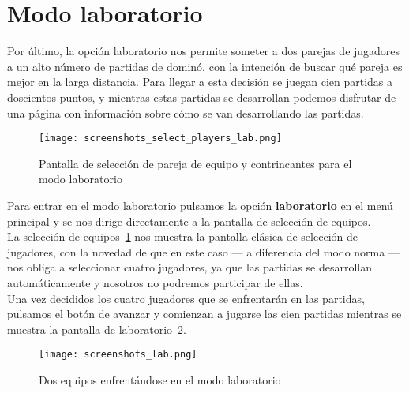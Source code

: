 \section{Modo laboratorio}

Por último, la opción laboratorio nos permite someter a dos parejas de jugadores a un alto número de partidas
de dominó, con la intención de buscar qué pareja es mejor en la larga distancia. Para llegar a esta decisión se
juegan cien partidas a doscientos puntos, y mientras estas partidas se desarrollan podemos disfrutar de una página
con información sobre cómo se van desarrollando las partidas. \\

\begin{figure}[h]
  \begin{center}
    \texttt{[image: screenshots\_select\_players\_lab.png]}
  \end{center}
  \caption{Pantalla de selección de pareja de equipo y contrincantes para el modo laboratorio}
  \label{fig:screenshotsselectplayerslab}
\end{figure}

Para entrar en el modo laboratorio pulsamos la opción \textbf{laboratorio} en el menú principal y se nos dirige directamente
a la pantalla de selección de equipos. \\

La selección de equipos~\ref{fig:screenshotsselectplayerslab} nos muestra la pantalla clásica de selección de jugadores,
con la novedad de que en este caso --- a diferencia del modo norma --- nos obliga a seleccionar cuatro jugadores, ya que
las partidas se desarrollan automáticamente y nosotros no podremos participar de ellas. \\

Una vez decididos los cuatro jugadores que se enfrentarán en las partidas, pulsamos el botón de avanzar y comienzan
a jugarse las cien partidas mientras se muestra la pantalla de laboratorio~\ref{fig:screenshots_lab}. \\
 
\begin{figure}[h]
  \begin{center}
    \texttt{[image: screenshots\_lab.png]}
  \end{center}
  \caption{Dos equipos enfrentándose en el modo laboratorio}
  \label{fig:screenshots_lab}
\end{figure}

